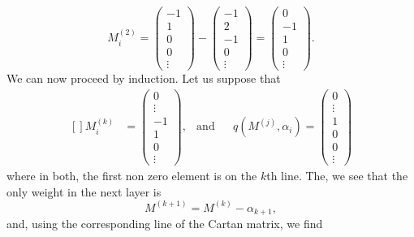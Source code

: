 \begin{equation}
	M^{(2)}_i=
	\begin{pmatrix}
		-1\\1\\0\\0\\\vdots
	\end{pmatrix}-
	\begin{pmatrix}
		-1\\2\\-1\\0\\\vdots
	\end{pmatrix}=
	\begin{pmatrix}
		0\\-1\\1\\0\\\vdots
	\end{pmatrix}.
\end{equation}
We can now proceed by induction. Let us suppose that
\begin{equation}
	\begin{aligned}[]
		M^{(k)}_i&=
		\begin{pmatrix}
			0\\\vdots\\-1\\1\\0\\\vdots
		\end{pmatrix},&\text{and}&
		&q(M^{(j)},\alpha_i)=
		\begin{pmatrix}
			0\\\vdots\\1\\0\\0\\\vdots
		\end{pmatrix}
	\end{aligned}
\end{equation}
where in both, the first non zero element is on the $k$th line. The, we see that the only weight in the next layer is
\begin{equation}
	M^{(k+1)}=M^{(k)}-\alpha_{k+1},
\end{equation}
and, using the corresponding line of the Cartan matrix, we find
